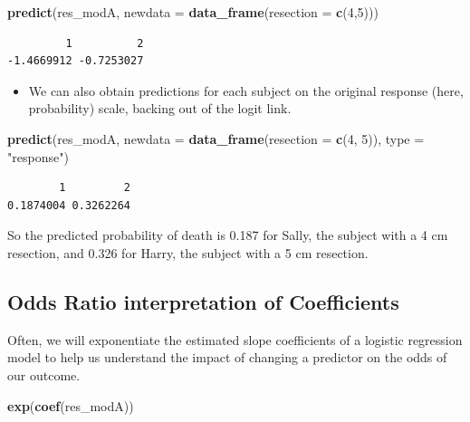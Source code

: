 \documentclass[]{book}
\newenvironment{Shaded}{\begin{snugshade}}{\end{snugshade}}
\newcommand{\KeywordTok}[1]{\textcolor[rgb]{0.13,0.29,0.53}{\textbf{#1}}}
\newcommand{\DataTypeTok}[1]{\textcolor[rgb]{0.13,0.29,0.53}{#1}}
\newcommand{\DecValTok}[1]{\textcolor[rgb]{0.00,0.00,0.81}{#1}}
\newcommand{\StringTok}[1]{\textcolor[rgb]{0.31,0.60,0.02}{#1}}
\newcommand{\NormalTok}[1]{#1}
\providecommand{\tightlist}{%
  \setlength{\itemsep}{0pt}\setlength{\parskip}{0pt}}
\theoremstyle{definition}
\theoremstyle{definition}
\theoremstyle{definition}
\theoremstyle{remark}
\begin{document}
\begin{Shaded}
\begin{Highlighting}[]
\KeywordTok{predict}\NormalTok{(res_modA, }\DataTypeTok{newdata =} \KeywordTok{data_frame}\NormalTok{(}\DataTypeTok{resection =} \KeywordTok{c}\NormalTok{(}\DecValTok{4}\NormalTok{,}\DecValTok{5}\NormalTok{)))}
\end{Highlighting}
\end{Shaded}

\begin{verbatim}
         1          2 
-1.4669912 -0.7253027 
\end{verbatim}

\begin{itemize}
\tightlist
\item
  We can also obtain predictions for each subject on the original
  response (here, probability) scale, backing out of the logit link.
\end{itemize}

\begin{Shaded}
\begin{Highlighting}[]
\KeywordTok{predict}\NormalTok{(res_modA, }\DataTypeTok{newdata =} \KeywordTok{data_frame}\NormalTok{(}\DataTypeTok{resection =} \KeywordTok{c}\NormalTok{(}\DecValTok{4}\NormalTok{, }\DecValTok{5}\NormalTok{)), }
        \DataTypeTok{type =} \StringTok{"response"}\NormalTok{)}
\end{Highlighting}
\end{Shaded}

\begin{verbatim}
        1         2 
0.1874004 0.3262264 
\end{verbatim}

So the predicted probability of death is 0.187 for Sally, the subject
with a 4 cm resection, and 0.326 for Harry, the subject with a 5 cm
resection.

\subsection{Odds Ratio interpretation of
Coefficients}\label{odds-ratio-interpretation-of-coefficients}

Often, we will exponentiate the estimated slope coefficients of a
logistic regression model to help us understand the impact of changing a
predictor on the odds of our outcome.

\begin{Shaded}
\begin{Highlighting}[]
\KeywordTok{exp}\NormalTok{(}\KeywordTok{coef}\NormalTok{(res_modA))}
\end{Highlighting}
\end{Shaded}
\end{document}
